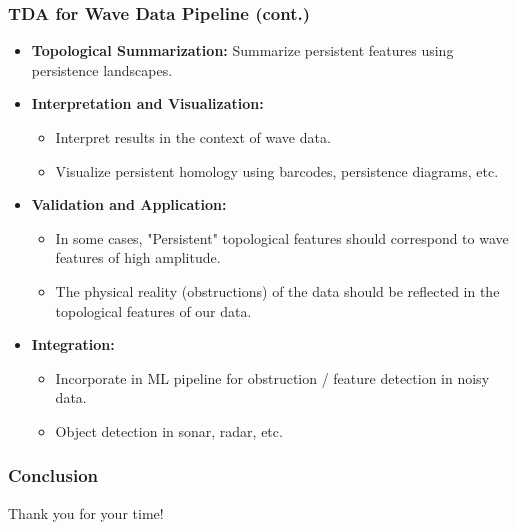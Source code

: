 \documentclass{beamer}
\begin{document}
\begin{frame}
  \frametitle{TDA for Wave Data Pipeline (cont.)}

  \begin{itemize}
    \setlength\itemsep{1em} %
    \item \textbf{Topological Summarization:} Summarize persistent features using persistence landscapes.
    \item \textbf{Interpretation and Visualization:}
      \begin{itemize}
        \setlength\itemsep{0.5em} %
        \item Interpret results in the context of wave data.
        \item Visualize persistent homology using barcodes, persistence diagrams, etc.
      \end{itemize}
    \item \textbf{Validation and Application:}
      \begin{itemize}
        \setlength\itemsep{0.5em} %
        \item In some cases, "Persistent" topological features should correspond to wave features of high amplitude.
        \item The physical reality (obstructions) of the data should be reflected in the topological features of our data.
      \end{itemize}
    \item \textbf{Integration:}
      \begin{itemize}
        \setlength\itemsep{0.5em} %
        \item Incorporate in ML pipeline for obstruction / feature detection in noisy data.
        \item Object detection in sonar, radar, etc.
      \end{itemize}
  \end{itemize}
\end{frame}

\begin{frame}


  \frametitle{Conclusion}

Thank you for your time!
  \end{frame}
\end{document}
